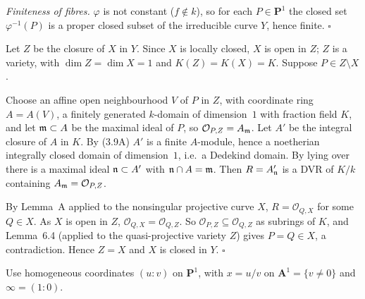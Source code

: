 \documentclass[11pt]{article}
\begin{document}
\emph{Finiteness of fibres.} $\varphi$ is not constant ($f\notin k$), so for each $P\in\mathbf P^1$ the closed set $\varphi^{-1}(P)$ is a proper closed subset of the irreducible curve $Y$, hence finite. \hfill$\square$

\pf
Let $Z$ be the closure of $X$ in $Y$. Since $X$ is locally closed, $X$ is open in $Z$; $Z$ is a variety, with $\dim Z=\dim X=1$ and $K(Z)=K(X)=K$. Suppose $P\in Z\setminus X$.

Choose an affine open neighbourhood $V$ of $P$ in $Z$, with coordinate ring $A=A(V)$, a finitely generated $k$-domain of dimension~$1$ with fraction field $K$, and let $\mathfrak m\subset A$ be the maximal ideal of $P$, so $\mathcal O_{P,Z}=A_\mathfrak m$. Let $A'$ be the integral closure of $A$ in $K$. By (3.9A) $A'$ is a finite $A$-module, hence a noetherian integrally closed domain of dimension~$1$, i.e.\ a Dedekind domain. By lying over there is a maximal ideal $\mathfrak n\subset A'$ with $\mathfrak n\cap A=\mathfrak m$. Then $R=A'_\mathfrak n$ is a DVR of $K/k$ containing $A_\mathfrak m=\mathcal O_{P,Z}$.

By Lemma~A applied to the nonsingular projective curve $X$, $R=\mathcal O_{Q,X}$ for some $Q\in X$. As $X$ is open in $Z$, $\mathcal O_{Q,X}=\mathcal O_{Q,Z}$. So $\mathcal O_{P,Z}\subseteq\mathcal O_{Q,Z}$ as subrings of $K$, and Lemma~6.4 (applied to the quasi-projective variety $Z$) gives $P=Q\in X$, a contradiction. Hence $Z=X$ and $X$ is closed in $Y$. \hfill$\square$

\pf
Use homogeneous coordinates $(u:v)$ on $\mathbf P^1$, with $x=u/v$ on $\mathbf A^1=\{v\ne0\}$ and $\infty=(1:0)$.
\end{document}

